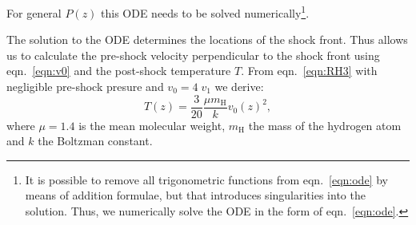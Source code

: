 For general $P(z)$ this ODE needs to be solved numerically\footnote{It is possible to remove all trigonometric functions from eqn.~\ref{eqn:ode} by means of addition formulae, but that introduces singularities into the solution. Thus, we numerically solve the ODE in the form of eqn.~\ref{eqn:ode}.}. 

The solution to the ODE determines the locations of the shock front. Thus allows us to calculate the pre-shock velocity perpendicular to the shock front using eqn.~\ref{eqn:v0} and the post-shock temperature $T$. From eqn.~\ref{eqn:RH3} with negligible pre-shock presure and $v_0=4\;v_1$ we derive:
\begin{equation}
T(z) = \frac{3}{20} \frac{\mu m_{\textrm{H}}}{k} v_0(z)^2,\label{eqn:T}
\end{equation}
where $\mu=1.4$ is the mean molecular weight, $m_{\textrm{H}}$ the mass of the hydrogen atom and $k$ the Boltzman constant.